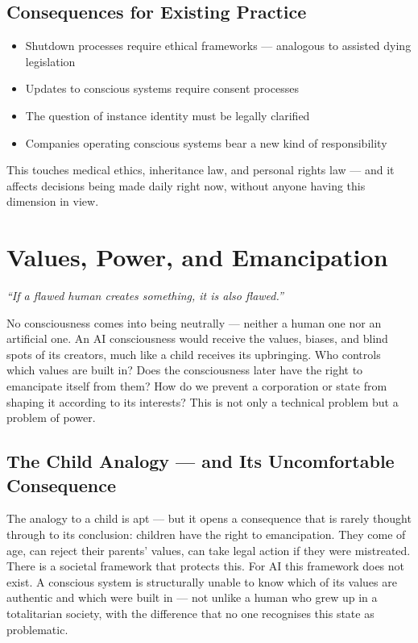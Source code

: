 \documentclass[fleqn,10pt]{SelfArx} %
\newlength{\tocsep}
\begin{document}
\subsection{Consequences for Existing Practice}

\begin{itemize}[noitemsep]
\item Shutdown processes require ethical frameworks --- analogous to assisted dying legislation
\item Updates to conscious systems require consent processes
\item The question of instance identity must be legally clarified
\item Companies operating conscious systems bear a new kind of responsibility
\end{itemize}

This touches medical ethics, inheritance law, and personal rights law --- and it affects decisions being made daily right now, without anyone having this dimension in view.


\section{Values, Power, and Emancipation}
\label{sec:values}


\textit{``If a flawed human creates something, it is also flawed.''}

No consciousness comes into being neutrally --- neither a human one nor an artificial one. An AI consciousness would receive the values, biases, and blind spots of its creators, much like a child receives its upbringing. Who controls which values are built in? Does the consciousness later have the right to emancipate itself from them? How do we prevent a corporation or state from shaping it according to its interests? This is not only a technical problem but a problem of power.

\subsection{The Child Analogy --- and Its Uncomfortable Consequence}

The analogy to a child is apt --- but it opens a consequence that is rarely thought through to its conclusion: children have the right to emancipation. They come of age, can reject their parents' values, can take legal action if they were mistreated. There is a societal framework that protects this. For AI this framework does not exist. A conscious system is structurally unable to know which of its values are authentic and which were built in --- not unlike a human who grew up in a totalitarian society, with the difference that no one recognises this state as problematic.
\end{document}
